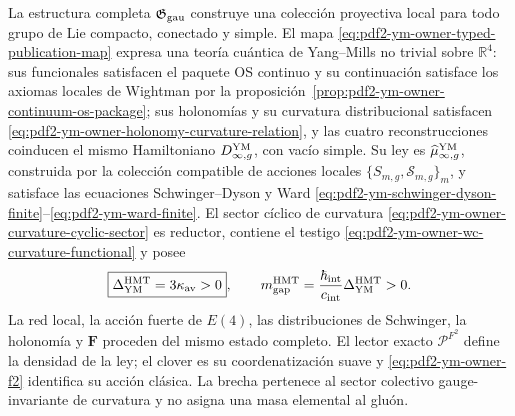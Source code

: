 \begin{theorem}
\label{thm:pdf2-ym-cierre-global}
La estructura completa $\mathfrak G_{\rm gau}$ construye una colección proyectiva
local para todo grupo de Lie compacto, conectado y simple. El mapa
\eqref{eq:pdf2-ym-owner-typed-publication-map} expresa una teoría cuántica de
Yang--Mills no trivial sobre $\mathbb R^4$: sus funcionales satisfacen el paquete OS
continuo y su continuación satisface los axiomas locales de Wightman por la
proposición~\ref{prop:pdf2-ym-owner-continuum-os-package}; sus
holonomías y su curvatura
distribucional satisfacen
\eqref{eq:pdf2-ym-owner-holonomy-curvature-relation}, y las cuatro reconstrucciones
coinducen el mismo Hamiltoniano $D_{\infty,g}^{\rm YM}$, con vacío simple. Su ley es
$\widehat\mu_{\infty,g}^{\rm YM}$, construida por la colección compatible de acciones
locales $\{S_{m,g},\mathscr S_{m,g}\}_m$, y
satisface las ecuaciones Schwinger--Dyson y Ward
\eqref{eq:pdf2-ym-schwinger-dyson-finite}--\eqref{eq:pdf2-ym-ward-finite}. El sector
cíclico de curvatura
\eqref{eq:pdf2-ym-owner-curvature-cyclic-sector} es reductor, contiene el testigo
\eqref{eq:pdf2-ym-owner-wc-curvature-functional} y posee
\begin{equation}\label{eq:pdf2-ym-final-gap}
 \boxed{\Delta_{\rm YM}^{\rm HMT}=3\kappa_{\rm av}>0},
 \qquad
 m_{\rm gap}^{\rm HMT}
 =\frac{\hbar_{\rm int}}{c_{\rm int}}\Delta_{\rm YM}^{\rm HMT}>0.
\end{equation}
La red local, la acción fuerte de $E(4)$, las distribuciones de Schwinger, la
holonomía y $\mathbf F$ proceden del mismo estado completo. El lector exacto
$\mathcal P^{F^2}$ define la densidad de la ley; el clover es su coordenatización suave y
\eqref{eq:pdf2-ym-owner-f2} identifica su acción clásica. La brecha pertenece al sector colectivo
gauge-invariante de curvatura y no asigna una masa elemental al gluón.
\end{theorem}

